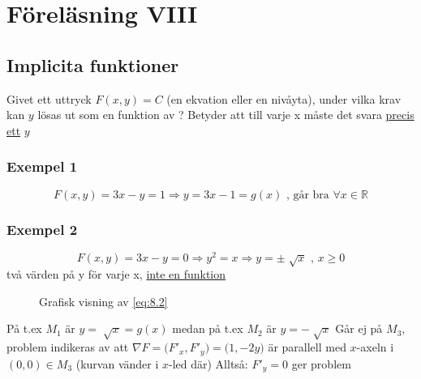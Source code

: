 \documentclass{article}
\let\oldsqrt\sqrt
\renewcommand*{\sqrt}[2][\ ]{\oldsqrt[#1]{#2} }
\begin{document}
\newpage
\section{Föreläsning VIII}
\subsection{Implicita funktioner}

Givet ett uttryck \(F(x,y)=C\) (en ekvation eller en nivåyta), under vilka krav kan \(y\) lösas ut som en funktion av ? \newline
Betyder att till varje x måste det svara \underline{precis ett} \(y\)

\subsubsection{Exempel 1}
\begin{equation} \label{eq:8.1}
	F(x,y) = 3x-y = 1 \Rightarrow y = 3x-1 = g(x) \text{ , går bra } \forall x \in \mathbb{R}
\end{equation}

\subsubsection{Exempel 2}
\begin{equation} \label{eq:8.2}
	F(x,y) = 3x-y = 0 \Rightarrow y^2 = x \Rightarrow y = \pm \sqrt{x} \text{ , } x \geq 0
\end{equation}
två värden på y för varje x, \underline{inte en funktion}

\begin{figure}[ht] 
  \caption{Grafisk visning av \eqref{eq:8.2}} \label{fig:8.1}
\end{figure}

På t.ex \(M_1\) är \(y = \sqrt{x} = g(x)\) medan på t.ex \(M_2\) är \(y = -\sqrt{x}\) \newline
Går ej på \(M_3\), problem indikeras av att \(\nabla F = \Big(F'_x,F'_y\Big) = \Big(1,-2y\Big)\) är parallell med \(x\)-axeln i \((0,0) \in M_3\) (kurvan vänder i \(x\)-led där) \newline
Alltså: \(F'_y = 0\) ger problem
\end{document}
